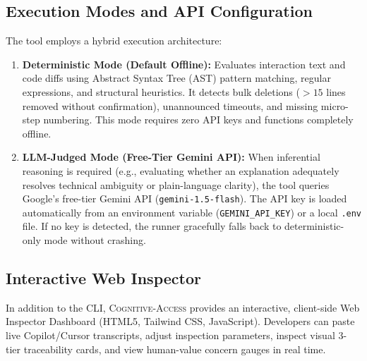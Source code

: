 \documentclass[conference]{IEEEtran}
\begin{document}
\subsection{Execution Modes and API Configuration}
The tool employs a hybrid execution architecture:
\begin{enumerate}
    \item \textbf{Deterministic Mode (Default Offline):} Evaluates interaction text and code diffs using Abstract Syntax Tree (AST) pattern matching, regular expressions, and structural heuristics. It detects bulk deletions ($>15$ lines removed without confirmation), unannounced timeouts, and missing micro-step numbering. This mode requires zero API keys and functions completely offline.
    \item \textbf{LLM-Judged Mode (Free-Tier Gemini API):} When inferential reasoning is required (e.g., evaluating whether an explanation adequately resolves technical ambiguity or plain-language clarity), the tool queries Google's free-tier Gemini API (\texttt{gemini-1.5-flash}). The API key is loaded automatically from an environment variable (\texttt{GEMINI\_API\_KEY}) or a local \texttt{.env} file. If no key is detected, the runner gracefully falls back to deterministic-only mode without crashing.
\end{enumerate}

\subsection{Interactive Web Inspector}
In addition to the CLI, \textsc{Cognitive-Access} provides an interactive, client-side Web Inspector Dashboard (HTML5, Tailwind CSS, JavaScript). Developers can paste live Copilot/Cursor transcripts, adjust inspection parameters, inspect visual 3-tier traceability cards, and view human-value concern gauges in real time.
\end{document}
